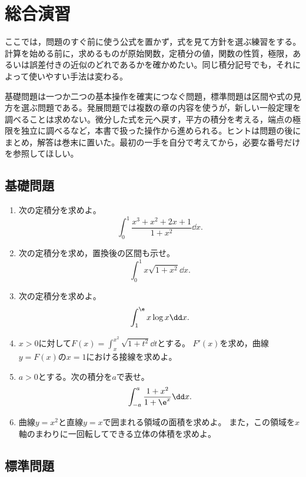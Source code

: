 \chapter{総合演習}\label{章:総合演習}

ここでは，問題のすぐ前に使う公式を置かず，式を見て方針を選ぶ練習をする。計算を始める前に，求めるものが原始関数，定積分の値，関数の性質，極限，あるいは誤差付きの近似のどれであるかを確かめたい。同じ積分記号でも，それによって使いやすい手法は変わる。

基礎問題は一つか二つの基本操作を確実につなぐ問題，標準問題は区間や式の見方を選ぶ問題である。発展問題では複数の章の内容を使うが，新しい一般定理を調べることは求めない。微分した式を元へ戻す，平方の積分を考える，端点の極限を独立に調べるなど，本書で扱った操作から進められる。ヒントは問題の後にまとめ，解答は巻末に置いた。最初の一手を自分で考えてから，必要な番号だけを参照してほしい。

\section{基礎問題}\label{節:総合基礎}

\begin{enumerate}[label=\textbf{\thechapter.\arabic*},leftmargin=*]
 \item\label{問:総合一割り算}
 次の定積分を求めよ。
 \[
  \int_0^1\frac{x^3+x^2+2x+1}{1+x^2}\dd x.
 \]
 \item\label{問:総合二置換}
 次の定積分を求め，置換後の区間も示せ。
 \[
  \int_0^1x\sqrt{1+x^2}\dd x.
 \]
 \item\label{問:総合三部分積分}
 次の定積分を求めよ。
 \[
  \int_1^{\e}x\log x\dd x.
 \]
 \item\label{問:総合四動く端点}
 $x>0$に対して$F(x)=\int_x^{x^2}\sqrt{1+t^2}\dd t$とする。
 $F'(x)$を求め，曲線$y=F(x)$の$x=1$における接線を求めよ。
 \item\label{問:総合五相補重み}
 $a>0$とする。次の積分を$a$で表せ。
 \[
  \int_{-a}^{a}\frac{1+x^2}{1+\e^x}\dd x.
 \]
 \item\label{問:総合六面積体積}
 曲線$y=x^2$と直線$y=x$で囲まれる領域の面積を求めよ。
 また，この領域を$x$軸のまわりに一回転してできる立体の体積を求めよ。
\end{enumerate}

\section{標準問題}\label{節:総合標準}

